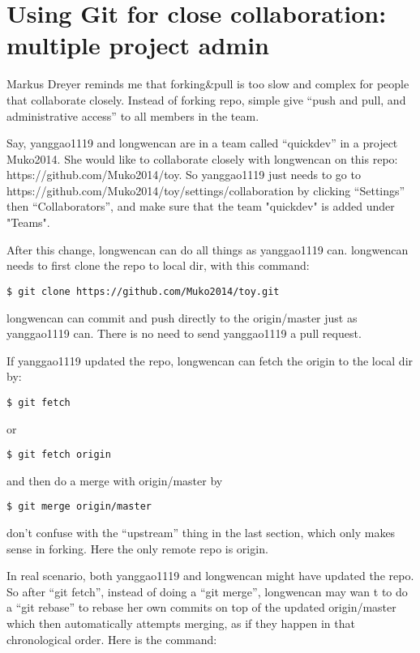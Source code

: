 \documentclass{article} %
\newcommand{\q}[1]{``#1''}
\begin{document}
\section{Using Git for close collaboration: multiple project admin}

Markus Dreyer reminds me that forking\&pull is too slow and complex for people that collaborate closely. Instead of forking repo, simple give \q{push and pull, and administrative access} to all members in the team. 

Say, yanggao1119 and longwencan are in a team called \q{quickdev} in a project Muko2014. She would like to collaborate closely with longwencan on this repo: https://github.com/Muko2014/toy. So yanggao1119 just needs to go to https://github.com/Muko2014/toy/settings/collaboration by clicking \q{Settings} then \q{Collaborators}, and make sure that the team "quickdev" is added under "Teams".

After this change, longwencan can do all things as yanggao1119 can. longwencan needs to first clone the repo to local dir, with this command:

\begin{lstlisting}
$ git clone https://github.com/Muko2014/toy.git
\end{lstlisting}

longwencan can commit and push directly to the origin/master just as yanggao1119 can. There is no need to send yanggao1119 a pull request.

If yanggao1119 updated the repo, longwencan can fetch the origin to the local dir by:

\begin{lstlisting}
$ git fetch
\end{lstlisting}

or 

\begin{lstlisting}
$ git fetch origin
\end{lstlisting}

and then do a merge with origin/master by

\begin{lstlisting}
$ git merge origin/master
\end{lstlisting}

don't confuse with the \q{upstream} thing in the last section, which only makes sense in forking. Here the only remote repo is origin.

In real scenario, both yanggao1119 and longwencan might have updated the repo. So after \q{git fetch}, instead of doing a \q{git merge}, longwencan may wan t to do a \q{git rebase} to rebase her own commits on top of the updated origin/master which then automatically attempts merging, as if they happen in that chronological order. Here is the command:
\end{document}
